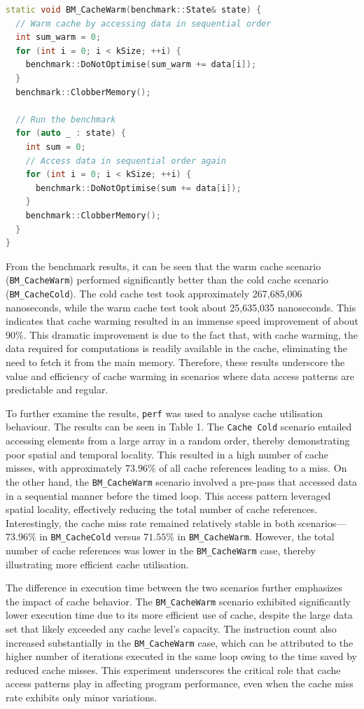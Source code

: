 \documentclass{article}
\theoremstyle{break}
\begin{document}
\begin{lstlisting}[style=customc++, language=C++, caption={Warm cache Google benchmark}]
static void BM_CacheWarm(benchmark::State& state) {
  // Warm cache by accessing data in sequential order
  int sum_warm = 0;
  for (int i = 0; i < kSize; ++i) {
    benchmark::DoNotOptimise(sum_warm += data[i]);
  }
  benchmark::ClobberMemory();
 
  // Run the benchmark
  for (auto _ : state) {
    int sum = 0;
    // Access data in sequential order again
    for (int i = 0; i < kSize; ++i) {
      benchmark::DoNotOptimise(sum += data[i]);
    }
    benchmark::ClobberMemory();
  }
}
\end{lstlisting}

\noindent From the benchmark results, it can be seen that the warm cache scenario (\texttt{BM\_Cache\-Warm}) performed significantly better than the cold cache scenario (\texttt{BM\_CacheCold}). The cold cache test took approximately 267,685,006 nanoseconds, while the warm cache test took about 25,635,035 nanoseconds. This indicates that cache warming resulted in an immense speed improvement of about \(90\%\). This dramatic improvement is due to the fact that, with cache warming, the data required for computations is readily available in the cache, eliminating the need to fetch it from the main memory. Therefore, these results underscore the value and efficiency of cache warming in scenarios where data access patterns are predictable and regular.


To further examine the results, \texttt{perf} was used to analyse cache utilisation behaviour. The results can be seen in Table 1. The \texttt{Cache Cold} scenario entailed accessing elements from a large array in a random order, thereby demonstrating poor spatial and temporal locality. This resulted in a high number of cache misses, with approximately \(73.96\%\) of all cache references leading to a miss. On the other hand, the \texttt{BM\_CacheWarm} scenario involved a pre-pass that accessed data in a sequential manner before the timed loop. This access pattern leveraged spatial locality, effectively reducing the total number of cache references. Interestingly, the cache miss rate remained relatively stable in both scenarios---\(73.96\%\) in \texttt{BM\_CacheCold} versus \(71.55\%\) in \texttt{BM\_CacheWarm}. However, the total number of cache references was lower in the \texttt{BM\_CacheWarm} case, thereby illustrating more efficient cache utilisation.


The difference in execution time between the two scenarios further emphasizes the impact of cache behavior. The \texttt{BM\_CacheWarm} scenario exhibited significantly lower execution time due to its more efficient use of cache, despite the large data set that likely exceeded any cache level's capacity. The instruction count also increased substantially in the \texttt{BM\_CacheWarm} case, which can be attributed to the higher number of iterations executed in the same loop owing to the time saved by reduced cache misses. This experiment underscores the critical role that cache access patterns play in affecting program performance, even when the cache miss rate exhibits only minor variations. 
\end{document}
